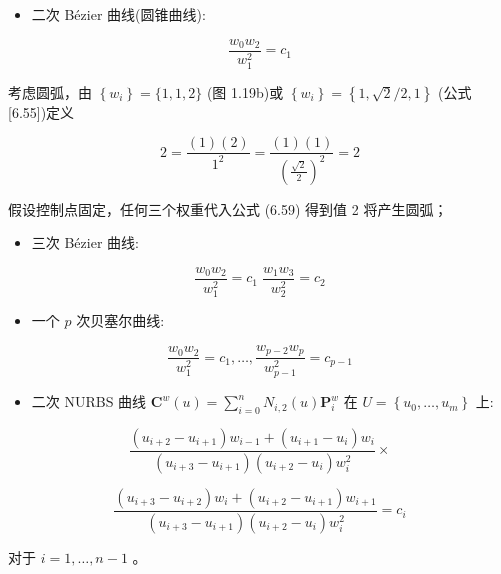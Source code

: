 \documentclass[../main.tex]{subfiles}
\begin{document}
\begin{itemize}
\item 二次 Bézier 曲线(圆锥曲线):
\end{itemize}

\[
\frac{{w}_{0}{w}_{2}}{{w}_{1}^{2}} = {c}_{1} \tag{6.59}
\]



考虑圆弧，由 \(\left\{  {w}_{i}\right\}   = \{ 1,1,2\}\) (图 1.19b)或 \(\left\{  {w}_{i}\right\}   = \left\{  {1,\sqrt{2}/2,1}\right\}\) (公式 [6.55])定义

\[
2 = \frac{\left( 1\right) \left( 2\right) }{{1}^{2}} = \frac{\left( 1\right) \left( 1\right) }{{\left( \frac{\sqrt{2}}{2}\right) }^{2}} = 2
\]

假设控制点固定，任何三个权重代入公式 (6.59) 得到值 2 将产生圆弧；

\begin{itemize}
\item 三次 Bézier 曲线:
\end{itemize}

\[
\frac{{w}_{0}{w}_{2}}{{w}_{1}^{2}} = {c}_{1}\;\frac{{w}_{1}{w}_{3}}{{w}_{2}^{2}} = {c}_{2} \tag{6.60}
\]

\begin{itemize}
\item 一个 \(p\) 次贝塞尔曲线:
\end{itemize}

\[
\frac{{w}_{0}{w}_{2}}{{w}_{1}^{2}} = {c}_{1},\ldots ,\frac{{w}_{p - 2}{w}_{p}}{{w}_{p - 1}^{2}} = {c}_{p - 1} \tag{6.61}
\]

\begin{itemize}
\item 二次 NURBS 曲线 \({\mathbf{C}}^{w}\left( u\right)  = \mathop{\sum }\limits_{{i = 0}}^{n}{N}_{i,2}\left( u\right) {\mathbf{P}}_{i}^{w}\) 在 \(U = \left\{  {{u}_{0},\ldots ,{u}_{m}}\right\}\) 上:
\end{itemize}

\[
\frac{\left( {{u}_{i + 2} - {u}_{i + 1}}\right) {w}_{i - 1} + \left( {{u}_{i + 1} - {u}_{i}}\right) {w}_{i}}{\left( {{u}_{i + 3} - {u}_{i + 1}}\right) \left( {{u}_{i + 2} - {u}_{i}}\right) {w}_{i}^{2}} \times
\]

\[
\frac{\left( {{u}_{i + 3} - {u}_{i + 2}}\right) {w}_{i} + \left( {{u}_{i + 2} - {u}_{i + 1}}\right) {w}_{i + 1}}{\left( {{u}_{i + 3} - {u}_{i + 1}}\right) \left( {{u}_{i + 2} - {u}_{i}}\right) {w}_{i}^{2}} = {c}_{i} \tag{6.62}
\]

对于 \(i = 1,\ldots ,n - 1\) 。
\end{document}

